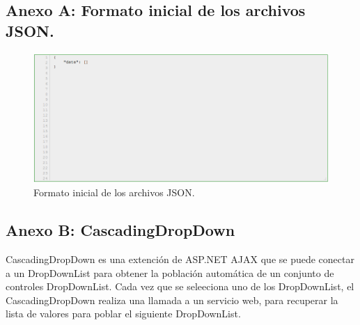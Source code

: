 \subsection*{Anexo A: Formato inicial de los archivos JSON.} 
	\begin{figure}[H]
		\centering
		\includegraphics[width=1\textwidth]{images/Anexos/Formato_JSON.png}
		\caption[Formato inicial de los archivos JSON. ]{Formato inicial de los archivos JSON.}
		\label{Formato_json}
	\end{figure}

\subsection*{Anexo B: CascadingDropDown}

CascadingDropDown es una extención de ASP.NET AJAX que se puede conectar a un  DropDownList para obtener la población automática de un conjunto de controles DropDownList. Cada vez que se seleeciona uno de los DropDownList, el CascadingDropDown realiza una llamada a un servicio web, para recuperar la lista de valores para poblar el siguiente DropDownList.
\\

